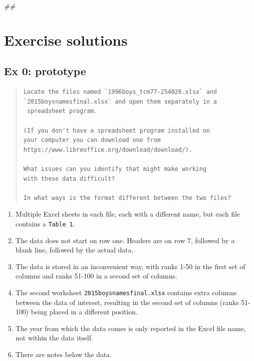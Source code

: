 \documentclass[]{book}
\newenvironment{Shaded}{\begin{snugshade}}{\end{snugshade}}
\newcommand{\CommentTok}[1]{\textcolor[rgb]{0.56,0.35,0.01}{\textit{#1}}}
\providecommand{\tightlist}{%
  \setlength{\itemsep}{0pt}\setlength{\parskip}{0pt}}
\begin{document}
\begin{Shaded}
\begin{Highlighting}[]
\CommentTok{## }
\end{Highlighting}
\end{Shaded}

\hypertarget{exercise-solutions-3}{%
\section{Exercise solutions}\label{exercise-solutions-3}}

\hypertarget{ex-0-prototype-3}{%
\subsection{Ex 0: prototype}\label{ex-0-prototype-3}}

\begin{quote}
\begin{verbatim}
Locate the files named `1996boys_tcm77-254026.xlsx` and 
`2015boysnamesfinal.xlsx` and open them separately in a 
 spreadsheet program. 

(If you don't have a spreadsheet program installed on
your computer you can download one from
https://www.libreoffice.org/download/download/). 

What issues can you identify that might make working
with these data difficult?

In what ways is the format different between the two files?
\end{verbatim}
\end{quote}

\begin{enumerate}
\def\labelenumi{\arabic{enumi}.}
\tightlist
\item
  Multiple Excel sheets in each file, each with a different name, but each file contains a \texttt{Table\ 1}.
\item
  The data does not start on row one. Headers are on row 7, followed by a blank line, followed by the actual data.
\item
  The data is stored in an inconvenient way, with ranks 1-50 in the first set of columns and ranks 51-100 in a second set of columns.
\item
  The second worksheet \texttt{2015boysnamesfinal.xlsx} contains extra columns between the data of interest, resulting in the second set of columns (ranks 51-100) being placed in a different position.
\item
  The year from which the data comes is only reported in the Excel file name, not within the data itself.
\item
  There are notes below the data.
\end{enumerate}
\end{document}
